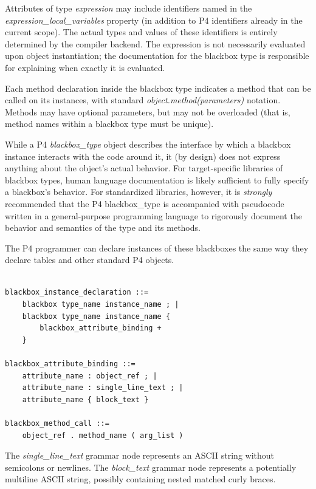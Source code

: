 \documentclass[12pt]{article}
\begin{document}
Attributes of type \textit{expression} may include identifiers named in the
\textit{expression_local_variables} property (in addition to P4 identifiers
already in the current scope). The actual types and values of these identifiers
is entirely determined by the compiler backend. The expression is not
necessarily evaluated upon object instantiation; the documentation for the
blackbox type is responsible for explaining when exactly it is evaluated.

Each method declaration inside the blackbox type indicates a method that can be
called on its instances, with standard \textit{object.method(parameters)} 
notation. Methods may have optional parameters, but may not be overloaded (that
is, method names within a blackbox type must be unique).

While a P4 \textit{blackbox_type} object describes the interface by which a
blackbox instance interacts with the code around it, it (by design) does not
express anything about the object's actual behavior. For target-specific
libraries of blackbox types, human language documentation is likely sufficient 
to fully specify a blackbox's behavior. For standardized libraries, however,
it is \textit{strongly} recommended that the P4 blackbox_type is accompanied
with pseudocode written in a general-purpose programming language to rigorously 
document the behavior and semantics of the type and its methods.

The P4 programmer can declare instances of these blackboxes the same way they
declare tables and other standard P4 objects.

\begin{lstlisting}[style=BNFstyle]

blackbox_instance_declaration ::= 
    blackbox type_name instance_name ; |
    blackbox type_name instance_name { 
        blackbox_attribute_binding +
    }

blackbox_attribute_binding ::=
    attribute_name : object_ref ; |
    attribute_name : single_line_text ; |
    attribute_name { block_text }

blackbox_method_call ::= 
    object_ref . method_name ( arg_list )

\end{lstlisting}

The \textit{single_line_text} grammar node represents an ASCII string without
semicolons or newlines. The \textit{block_text} grammar node represents a 
potentially multiline ASCII string, possibly containing nested matched curly
braces.
\end{document}
